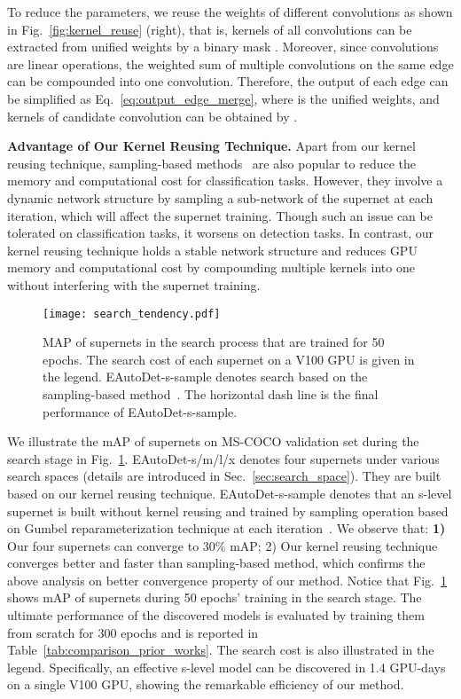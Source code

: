 \documentclass[letterpaper]{article} \usepackage{aaai22}  \usepackage{times}  \usepackage{helvet}  \usepackage{courier}  \usepackage[hyphens]{url}  \usepackage{graphicx} \urlstyle{rm} \def\UrlFont{\rm}  \usepackage{natbib}  \usepackage{caption} \DeclareCaptionStyle{ruled}{labelfont=normalfont,labelsep=colon,strut=off} \frenchspacing  \setlength{\pdfpagewidth}{8.5in}  \setlength{\pdfpageheight}{11in}
\begin{document}
To reduce the parameters, we reuse the weights of different convolutions as shown in Fig.~\ref{fig:kernel_reuse} (right), that is, kernels of all convolutions can be extracted from unified weights by a binary mask . Moreover, since convolutions are linear operations, the weighted sum of multiple convolutions on the same edge can be compounded into one convolution. Therefore, the output of each edge can be simplified as Eq.~\ref{eq:output_edge_merge}, where  is the unified weights, and kernels of candidate convolution  can be obtained by . 



\textbf{Advantage of Our Kernel Reusing Technique.}
Apart from our kernel reusing technique, sampling-based methods~\cite{xu2019pc,dong2019searching} are also popular to reduce the memory and computational cost for classification tasks. However, they involve a dynamic network structure by sampling a sub-network of the supernet at each iteration, which will affect the supernet training. Though such an issue can be tolerated on classification tasks, it worsens on detection tasks.
In contrast, our kernel reusing technique holds a stable network structure and reduces GPU memory and computational cost by compounding multiple kernels into one without interfering with the supernet training.


\begin{figure}[tb]
    \centering
\texttt{[image: search\_tendency.pdf]}
    \vspace{-10pt}
    \caption{MAP of supernets in the search process that are trained for 50 epochs. The search cost of each supernet on a V100 GPU is given in the legend. EAutoDet-s-sample denotes search based on the sampling-based method~\cite{dong2019searching}. The horizontal dash line is the final performance of EAutoDet-s-sample.}
    \label{fig:search_tendency}
\end{figure}

We illustrate the mAP of supernets on MS-COCO validation set during the search stage in Fig.~\ref{fig:search_tendency}. EAutoDet-s/m/l/x denotes four supernets under various search spaces (details are introduced in Sec.~\ref{sec:search_space}). They are built based on our kernel reusing technique. EAutoDet-s-sample denotes that an s-level supernet is built without kernel reusing and trained by sampling operation based on Gumbel reparameterization technique at each iteration~\cite{dong2019searching}. We observe that: \textbf{1)} Our four supernets can converge to 30\% mAP; 2) Our kernel reusing technique converges better and faster than sampling-based method, which confirms the above analysis on better convergence property of our method.
Notice that Fig.~\ref{fig:search_tendency} shows mAP of supernets during 50 epochs' training in the search stage. The ultimate performance of the discovered models is evaluated by training them from scratch for 300 epochs and is reported in Table~\ref{tab:comparison_prior_works}.
The search cost is also illustrated in the legend. Specifically, an effective s-level model can be discovered in 1.4 GPU-days on a single V100 GPU, showing the remarkable efficiency of our method. 
\end{document}
